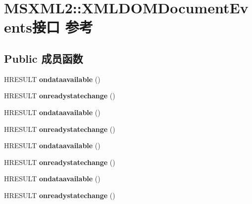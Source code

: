 \hypertarget{interface_m_s_x_m_l2_1_1_x_m_l_d_o_m_document_events}{}\section{M\+S\+X\+M\+L2\+:\+:X\+M\+L\+D\+O\+M\+Document\+Events接口 参考}
\label{interface_m_s_x_m_l2_1_1_x_m_l_d_o_m_document_events}
\subsection*{Public 成员函数}
\begin{DoxyCompactItemize}
\item 
\mbox{\label{interface_m_s_x_m_l2_1_1_x_m_l_d_o_m_document_events_a4df5ae1fd50def4f1d46c616fd9beae3}} 
H\+R\+E\+S\+U\+LT {\bfseries ondataavailable} ()
\item 
\mbox{\label{interface_m_s_x_m_l2_1_1_x_m_l_d_o_m_document_events_af71fd2132172ea36c170d009597b2383}} 
H\+R\+E\+S\+U\+LT {\bfseries onreadystatechange} ()
\item 
\mbox{\label{interface_m_s_x_m_l2_1_1_x_m_l_d_o_m_document_events_a4df5ae1fd50def4f1d46c616fd9beae3}} 
H\+R\+E\+S\+U\+LT {\bfseries ondataavailable} ()
\item 
\mbox{\label{interface_m_s_x_m_l2_1_1_x_m_l_d_o_m_document_events_af71fd2132172ea36c170d009597b2383}} 
H\+R\+E\+S\+U\+LT {\bfseries onreadystatechange} ()
\item 
\mbox{\label{interface_m_s_x_m_l2_1_1_x_m_l_d_o_m_document_events_a4df5ae1fd50def4f1d46c616fd9beae3}} 
H\+R\+E\+S\+U\+LT {\bfseries ondataavailable} ()
\item 
\mbox{\label{interface_m_s_x_m_l2_1_1_x_m_l_d_o_m_document_events_af71fd2132172ea36c170d009597b2383}} 
H\+R\+E\+S\+U\+LT {\bfseries onreadystatechange} ()
\item 
\mbox{\label{interface_m_s_x_m_l2_1_1_x_m_l_d_o_m_document_events_a4df5ae1fd50def4f1d46c616fd9beae3}} 
H\+R\+E\+S\+U\+LT {\bfseries ondataavailable} ()
\item 
\mbox{\label{interface_m_s_x_m_l2_1_1_x_m_l_d_o_m_document_events_af71fd2132172ea36c170d009597b2383}} 
H\+R\+E\+S\+U\+LT {\bfseries onreadystatechange} ()
\end{DoxyCompactItemize}


